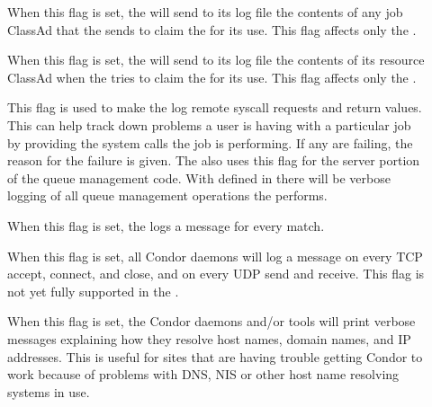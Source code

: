 \begin{description}
\begin{description}
  \item[] \label{dflag:job}
    When this flag is set, the
     will send to its log file the contents of any
    job ClassAd that the  sends to claim the
     for its use.  This flag affects only the
    .
    
  \item[] \label{dflag:machine}
    When this flag is set,
    the  will send to its log file the contents of
    its resource ClassAd when the  tries to claim the
     for its use.  This flag affects only the
    .

  \item[] \label{dflag:syscalls}
    This flag is used to
    make the  log remote syscall requests and return
    values.  This can help track down problems a user is having with a
    particular job by providing the system calls the job is
    performing. If any are failing, the reason for the
    failure is given.  The  also uses this flag for the server
    portion of the queue management code.  With 
    defined in  there will be verbose logging of all
    queue management operations the  performs.  

  \item[] \label{dflag:match}
    When this flag is
    set, the  logs a message for every match.

  \item[] \label{dflag:network}
    When this flag is set,
    all Condor daemons will log a message on every TCP accept, connect,
    and close, and on every UDP send and receive.  This flag is not
    yet fully supported in the .

  \item[] \label{dflag:hostname}
    When this flag is set, the Condor daemons and/or tools will print
    verbose messages explaining how they resolve host names, domain
    names, and IP addresses.
    This is useful for sites that are having trouble getting Condor to
    work because of problems with DNS, NIS or other host name resolving
    systems in use.


\end{description}
\end{description}
